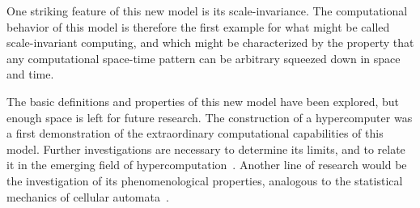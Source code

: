 \documentclass[pre,amssymb,showpacs,showkeys,preprint]{revtex4}
\begin{document}
One striking feature of this new model is its scale-invariance.
The computational behavior of this model is therefore the first example for what might be called
scale-invariant computing, and which might be characterized by the property that
any computational space-time pattern can be arbitrary squeezed down in space and time.

The basic definitions and properties of this new model have been explored, but enough space is left for
future research.
The construction of a hypercomputer was a first demonstration of the
extraordinary computational capabilities of this model.
Further investigations are necessary to determine its limits, and to relate it in the
emerging field of hypercomputation~\cite{2002-cal-pav,ord-2002}.
Another line of research would be the investigation of its phenomenological properties, analogous
to the statistical mechanics of cellular automata~\cite{wolfram83}.

%
%
\end{document}
